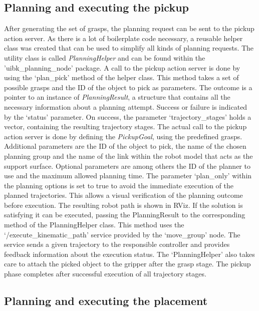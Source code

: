 \subsection{Planning and executing the pickup}

After generating the set of grasps, the planning request can be sent to the pickup action server. As there is a lot of boilerplate code necessary, a reusable helper class was created that can be used to simplify all kinds of planning requests. The utility class is called \emph{PlanningHelper} and can be found within the 'uibk\_planning\_node' package. A call to the pickup action server is done by using the `plan\_pick' method of the helper class. This method takes a set of possible grasps and the ID of the object to pick as parameters. The outcome is a pointer to an instance of \emph{PlanningResult}, a structure that contains all the necessary information about a planning attempt. Success or failure is indicated by the `status' parameter. On success, the parameter `trajectory\_stages' holds a vector, containing the resulting trajectory stages. The actual call to the pickup action server is done by defining the  \emph{PickupGoal}, using the predefined grasps. Additional parameters are the ID of the object to pick, the name of the chosen planning group and the name of the link within the robot model that acts as the support surface. Optional parameters are among others the ID of the planner to use and the maximum allowed planning time. The parameter `plan\_only' within the planning options is set to true to avoid the immediate execution of the planned trajectories. This allows a visual verification of the planning outcome before execution. The resulting robot path is shown in RViz. If the solution is satisfying it can be executed, passing the PlanningResult to the corresponding method of the PlanningHelper class. This method uses the `/execute\_kinematic\_path' service provided by the `move\_group' node. The service sends a given trajectory to the responsible controller and provides feedback information about the execution status. The `PlanningHelper' also takes care to attach the picked object to the gripper after the grasp stage. The pickup phase completes after successful execution of all trajectory stages.


\subsection{Planning and executing the placement}

